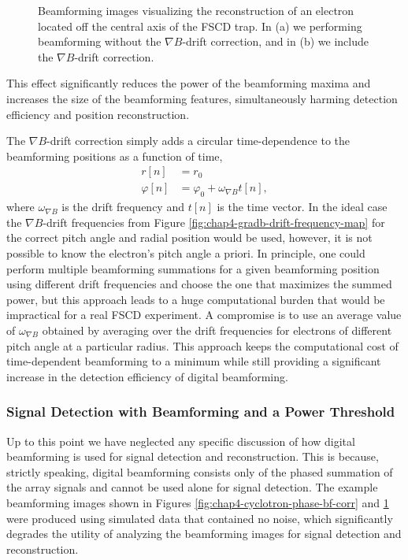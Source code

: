 \begin{figure}[htbp]
\begin{subfigure}{0.45\textwidth}
        \caption{}
    \end{subfigure}
    \caption{Beamforming images visualizing the reconstruction of an electron located off the central axis of the FSCD trap. In (a) we performing beamforming without the $\nabla B$-drift correction, and in (b) we include the $\nabla B$-drift correction.}
    \label{fig:chap4-gradb-bf-drift-corr}
\end{figure}
This effect significantly reduces the power of the beamforming maxima and increases the size of the beamforming features, simultaneously harming detection efficiency and position reconstruction. 

The $\nabla B$-drift correction simply adds a circular time-dependence to the beamforming positions as a function of time,
\begin{align}
    r[n]&=r_0\\
    \varphi[n]&=\varphi_0 + \omega_{\nabla B}t[n], 
\end{align}
where $\omega_{\nabla B}$ is the drift frequency and $t[n]$ is the time vector. In the ideal case the $\nabla B$-drift frequencies from Figure \ref{fig:chap4-gradb-drift-frequency-map} for the correct pitch angle and radial position would be used, however, it is not possible to know the electron's pitch angle a priori. In principle, one could perform multiple beamforming summations for a given beamforming position using different drift frequencies and choose the one that maximizes the summed power, but this approach leads to a huge computational burden that would be impractical for a real FSCD experiment. A compromise is to use an average value of $\omega_{\nabla B}$ obtained by averaging over the drift frequencies for electrons of different pitch angle at a particular radius. This approach keeps the computational cost of time-dependent beamforming to a minimum while still providing a significant increase in the detection efficiency of digital beamforming.

\subsubsection*{Signal Detection with Beamforming and a Power Threshold}

Up to this point we have neglected any specific discussion of how digital beamforming is used for signal detection and reconstruction. This is because, strictly speaking, digital beamforming consists only of the phased summation of the array signals and cannot be used alone for signal detection. The example beamforming images shown in Figures \ref{fig:chap4-cyclotron-phase-bf-corr} and \ref{fig:chap4-gradb-bf-drift-corr} were produced using simulated data that contained no noise, which significantly degrades the utility of analyzing the beamforming images for signal detection and reconstruction. 

